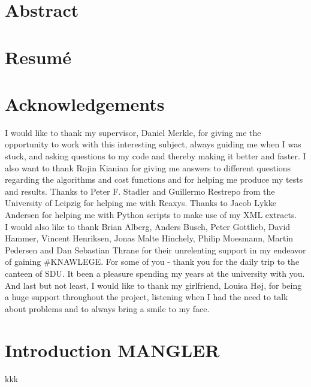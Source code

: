 \documentclass[a4paper,10pt,titlepage]{paper}
\begin{document}
\begin{titlepage}
\end{titlepage}

\vfill
\section*{Abstract}

\section*{Resumé}
\newpage

\tableofcontents
\newpage


\section{Acknowledgements}
I would like to thank my supervisor, Daniel Merkle, for giving me the opportunity to work with this interesting subject, always guiding me when I was stuck, and asking questions to my code and thereby making it better and faster. I also want to thank Rojin Kianian for giving me answers to different questions regarding the algorithms and cost functions and for helping me produce my tests and results. Thanks to Peter F. Stadler and Guillermo Restrepo from the University of Leipzig for helping me with Reaxys. Thanks to Jacob Lykke Andersen for helping me with Python scripts to make use of my XML extracts.\\
I would also like to thank Brian Alberg, Anders Busch, Peter Gottlieb, David Hammer, Vincent Henriksen, Jonas Malte Hinchely, Philip Moesmann, Martin Pedersen and Dan Sebastian Thrane for their unrelenting support in my endeavor of gaining \#KNAWLEGE. For some of you - thank you for the daily trip to the canteen of SDU. It been a pleasure spending my years at the university with you.\\
And last but not least, I would like to thank my girlfriend, Louisa Høj, for being a huge support throughout the project, listening when I had the need to talk about problems and to always bring a smile to my face.

\section{Introduction MANGLER}
kkk \cite{Grzybowski}\\
\end{document}
